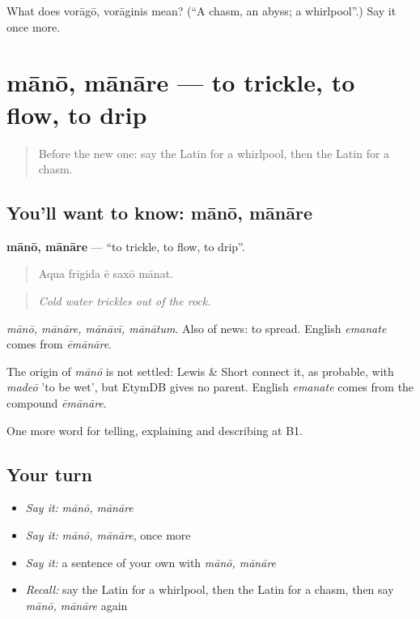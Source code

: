 \begin{tcolorbox}[breakable,colback=teal!4,colframe=teal!35!black,title={Before you move on}]
What does vorāgō, vorāginis mean? (\textquotedblleft{}A chasm, an abyss; a whirlpool\textquotedblright{}.) Say it once more.
\end{tcolorbox}
\section[mānō, mānāre]{mānō, mānāre — to trickle, to flow, to drip}

\label{lesson:LA-C483-mano}



\begin{quote}
Before the new one: say the Latin for a whirlpool, then the Latin for a chasm.
\end{quote}

\subsection*{You'll want to know: mānō, mānāre}
\textbf{mānō, mānāre} — \textquotedblleft{}to trickle, to flow, to drip\textquotedblright{}.

\begin{quote}
Aqua frīgida ē saxō mānat.
\end{quote}

\begin{quote}
\emph{Cold water trickles out of the rock.}
\end{quote}

\emph{mānō, mānāre, mānāvī, mānātum}. Also of news: to spread. English \emph{emanate} comes from \emph{ēmānāre}.

\begin{cousinweb}
The origin of \emph{mānō} is not settled: Lewis \& Short connect it, as probable, with \emph{madeō} 'to be wet', but EtymDB gives no parent. English \emph{emanate} comes from the compound \emph{ēmānāre}.
\end{cousinweb}

\begin{grammarlens}[title={What you've built}]
One more word for telling, explaining and describing at B1.
\end{grammarlens}

\subsection*{Your turn}
\begin{itemize}
\raggedright
  \item \emph{Say it:} \emph{mānō, mānāre}
  \item \emph{Say it:} \emph{mānō, mānāre}, once more
  \item \emph{Say it:} a sentence of your own with \emph{mānō, mānāre}
  \item \emph{Recall:} say the Latin for a whirlpool, then the Latin for a chasm, then say \emph{mānō, mānāre} again
\end{itemize}

